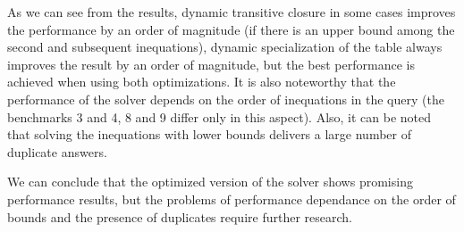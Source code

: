 As we can see from the results, dynamic transitive closure in some cases improves the performance by an order of magnitude (if there is an upper bound among the
second and subsequent inequations), dynamic specialization of the table always improves the result by an order of magnitude, but the best performance is achieved when using both optimizations.
It is also noteworthy that the performance of the solver depends on the order of inequations in the query (the benchmarks 3 and 4, 8 and 9 differ only in this aspect). Also, it can be noted that
solving the inequations with lower bounds delivers a large number of duplicate answers.

We can conclude that the optimized version of the solver shows promising performance results, but the problems of performance dependance on the order of bounds and
the presence of duplicates require further research.

